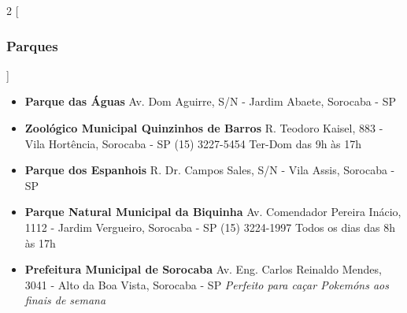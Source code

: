 \begin{multicols}{2}
  [
  \subsubsection{Parques}
  ]
  \begin{itemize}
    \item \textbf{Parque das Águas}
      \newline Av. Dom Aguirre, S/N - Jardim Abaete, Sorocaba - SP
  \end{itemize}
  \begin{itemize}
    \item \textbf{Zoológico Municipal Quinzinhos de Barros}
      \newline R. Teodoro Kaisel, 883 - Vila Hortência, Sorocaba - SP
      \newline (15) 3227-5454
      \newline Ter-Dom das 9h às 17h
  \end{itemize}
  \begin{itemize}
    \item \textbf{Parque dos Espanhois}
      \newline R. Dr. Campos Sales, S/N - Vila Assis, Sorocaba - SP
  \end{itemize}
  \begin{itemize}
    \item \textbf{Parque Natural Municipal da Biquinha}
      \newline Av. Comendador Pereira Inácio, 1112 - Jardim Vergueiro, Sorocaba - SP
      \newline (15) 3224-1997
      \newline Todos os dias das 8h às 17h
  \end{itemize}
  \begin{itemize}
    \item \textbf{Prefeitura Municipal de Sorocaba}
      \newline Av. Eng. Carlos Reinaldo Mendes, 3041 - Alto da Boa Vista, Sorocaba - SP
      \newline \textit{Perfeito para caçar Pokemóns aos finais de semana}
  \end{itemize}
\end{multicols}


